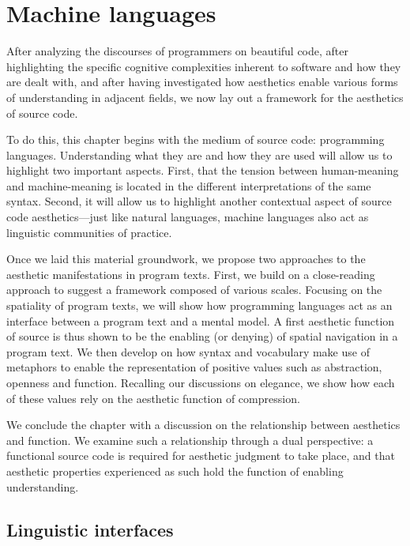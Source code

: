 \chapter{Machine languages}
\label{chap:programming}

After analyzing the discourses of programmers on beautiful code, after highlighting the specific cognitive complexities inherent to software and how they are dealt with, and after having investigated how aesthetics enable various forms of understanding in adjacent fields, we now lay out a framework for the aesthetics of source code.

To do this, this chapter begins with the medium of source code: programming languages. Understanding what they are and how they are used will allow us to highlight two important aspects. First, that the tension between human-meaning and machine-meaning is located in the different interpretations of the same syntax. Second, it will allow us to highlight another contextual aspect of source code aesthetics—just like natural languages, machine languages also act as linguistic communities of practice.

Once we laid this material groundwork, we propose two approaches to the aesthetic manifestations in program texts. First, we build on a close-reading approach to suggest a framework composed of various scales. Focusing on the spatiality of program texts, we will show how programming languages act as an interface between a program text and a mental model. A first aesthetic function of source is thus shown to be the enabling (or denying) of spatial navigation in a program text. We then develop on how syntax and vocabulary make use of metaphors to enable the representation of positive values such as abstraction, openness and function. Recalling our discussions on elegance, we show how each of these values rely on the aesthetic function of compression.

We conclude the chapter with a discussion on the relationship between aesthetics and function. We examine such a relationship through a dual perspective: a functional source code is required for aesthetic judgment to take place, and that aesthetic properties experienced as such hold the function of enabling understanding.

\section{Linguistic interfaces}
\label{sec:linguistic-interfaces}

